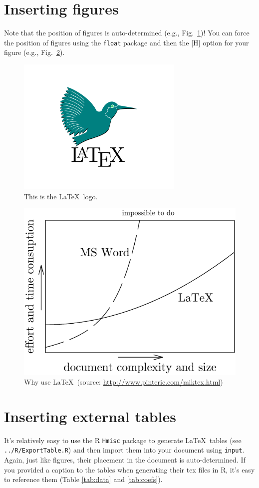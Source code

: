 \documentclass[12pt,letterpaper]{article}
\begin{document}
\section{Inserting figures}

Note that the position of figures is auto-determined (e.g., Fig.~\ref{fig:logo})!
You can force the position of figures using the \texttt{float} package and then the [H] option for your figure (e.g., Fig.~\ref{fig:miktex}).

\begin{figure}
	\centering
	\includegraphics[width=0.2\linewidth]{figs/LaTeX_logo.png}
	\caption{This is the \LaTeX~logo.}
	\label{fig:logo}
\end{figure}

\begin{figure}[H]
	\centering
	\includegraphics[width=0.8\linewidth]{figs/miktex.png}
	\caption{Why use \LaTeX\ (source: \url{http://www.pinteric.com/miktex.html})}
	\label{fig:miktex}
\end{figure}





\section{Inserting external tables}

It's relatively easy to use the R \texttt{Hmisc} package to generate \LaTeX\ tables (see
\texttt{../R/ExportTable.R}) and then import them into your document using \texttt{input}.
Again, just like figures, their placement in the document is auto-determined.
If you provided a caption to the tables when generating their tex files in R, it's easy to reference them (Table \ref{tab:data} and \ref{tab:coefs}).
\end{document}

